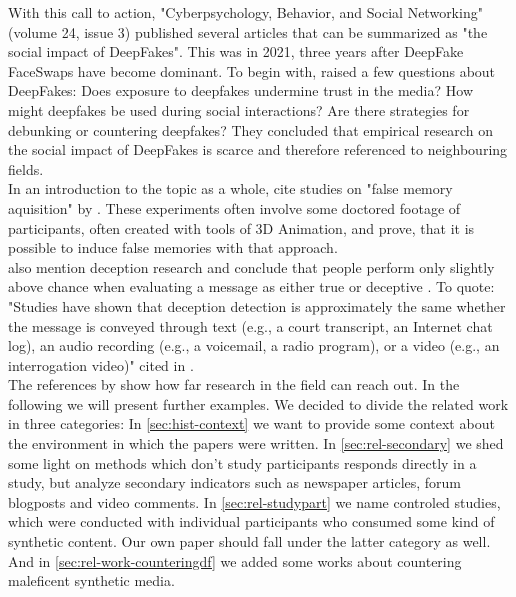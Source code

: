 \documentclass[
  a4paper,  %
  twoside,  %
  bibliography=totoc,
  headsepline,
  cleardoublepage=empty,
  parskip=half,
  draft=false
]{scrbook}
\begin{document}
With this call to action, "Cyberpsychology, Behavior, and Social Networking" (volume 24, issue 3) published several articles that can be summarized as "the social impact of DeepFakes". This was in 2021, three years after DeepFake FaceSwaps have become dominant. To begin with, \citet{hancockSocialImpactDeepfakes2021} raised a few questions about DeepFakes: Does exposure to deepfakes undermine trust in the media? How might deepfakes be used during social interactions? Are there strategies for debunking or countering deepfakes? They concluded that empirical research on the social impact of DeepFakes is scarce and therefore referenced to neighbouring fields. \\
In an introduction to the topic as a whole, \citet{hancockSocialImpactDeepfakes2021} cite studies on "false memory aquisition" by \citet{garryActuallyPictureWorth2005}. These experiments often involve some doctored footage of participants, often created with tools of 3D Animation, and prove, that it is possible to induce false memories with that approach. \\
\citet{hancockSocialImpactDeepfakes2021} also mention deception research and conclude that people perform only slightly above chance when evaluating a message as either true or deceptive \cite{bondAccuracyDeceptionJudgments2006}. To quote: "Studies have shown that deception detection is approximately the same whether the message is conveyed through text (e.g., a court transcript, an Internet chat log), an audio recording (e.g., a voicemail, a radio program), or a video (e.g., an interrogation video)" \cite{hancockSeeNoEvil2010} cited in \cite{hancockSocialImpactDeepfakes2021}. \\
The references by \citet{hancockSocialImpactDeepfakes2021} show how far research in the field can reach out. In the following we will present further examples. We decided to divide the related work in three categories: In \ref{sec:hist-context} we want to provide some context about the environment in which the papers were written. In \ref{sec:rel-secondary} we shed some light on methods which don't study participants responds directly in a study, but analyze secondary indicators such as newspaper articles, forum blogposts and video comments. In \ref{sec:rel-studypart} we name controled studies, which were conducted with individual participants who consumed some kind of synthetic content. Our own paper should fall under the latter category as well. And in \ref{sec:rel-work-counteringdf} we added some works about countering maleficent synthetic media.
\end{document}
